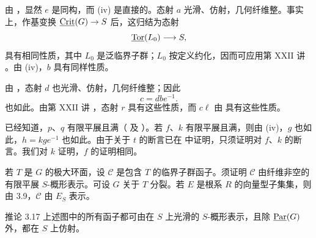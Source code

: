 \SGAProof
由 ，显然 \(e\) 是同构，而 (iv) 是直接的。态射 \(a\) 光滑、仿射，几何纤维整。事实上，作基变换 \(\underline{\operatorname{Crit}}(G)\to S\) 后，这归结为态射
\[
 \underline{\operatorname{Tor}}(L_0)\longrightarrow S,
\]
具有相同性质，其中 \(L_0\) 是泛临界子群；\(L_0\) 按定义约化，因而可应用第 XXII 讲 。由 (iv)，\(b\) 具有同样性质。

由 ，态射 \(d\) 也光滑、仿射，几何纤维整；因此
\[
 c=dbe^{-1}.
\]
也如此。由第 XXII 讲 ，态射 \(r\) 具有这些性质，而 \(c\ell\) 由  具有这些性质。

已经知道，\(p\)、\(q\) 有限平展且满（ 及 ）。若 \(f\)、\(k\) 有限平展且满，则由 (iv)，\(g\) 也如此，\(h=kge^{-1}\) 也如此。由于关于 \(t\) 的断言已在  中证明，只须证明对 \(f\)、\(k\) 的断言。我们对 \(k\) 证明，\(f\) 的证明相同。

若 \(T\) 是 \(G\) 的极大环面，设 \(\mathcal C\) 是包含 \(T\) 的临界子群函子。须证明 \(\mathcal C\) 由纤维非空的有限平展 \(S\)-概形表示。可设 \(G\) 关于 \(T\) 分裂。若 \(E\) 是根系 \(R\) 的向量型子集集，则由 3.9，\(\mathcal C\) 由 \(E_S\) 表示。
\SGAQED

\begin{sgastatement}{推论 3.17}
上述图中的所有函子都可由在 \(S\) 上光滑的 \(S\)-概形表示，且除 \(\underline{\operatorname{Par}}(G)\) 外，都在 \(S\) 上仿射。
\end{sgastatement}

